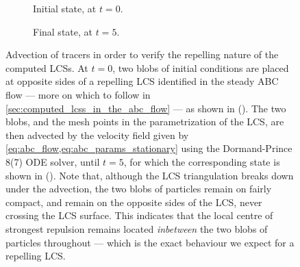 \begin{figure}[htpb]
    \centering
    \hspace*{\fill}
    \begin{subfigure}[b]{0.43\textwidth}
        \centering
        \caption[]{{\small Initial state, at $t=0$.}}
        \label{fig:blobtest-pre}
    \end{subfigure}\hfill%
    \begin{subfigure}[b]{0.43\textwidth}
        \centering
        \caption[]{{\small Final state, at $t=5$.}}
        \label{fig:blobtest-post}
    \end{subfigure}%
    \hspace*{\fill}
    \caption[Advection of tracers in order to verify the repelling nature of
    the computed \newline{}LCSs]
    {%
        Advection of tracers in order to verify the repelling nature of the
        computed LCSs. At $t=0$, two blobs of initial conditions are placed
        at opposite sides of a repelling LCS identified in the
        steady ABC flow --- more on which to follow in
        \cref{sec:computed_lcss_in_the_abc_flow} --- as shown in
        (). The two blobs, and the mesh points in
        the parametrization of the LCS, are then advected by the velocity
        field given by \cref{eq:abc_flow,eq:abc_params_stationary} using the
        Dormand-Prince 8(7) ODE solver, until $t=5$, for which the
        corresponding state is shown in (). Note
        that, although the LCS triangulation breaks down under the advection,
        the two blobs of particles remain on fairly compact, and remain on the
        opposite sides of the LCS, never crossing the LCS surface. This
        indicates that the local centre of strongest repulsion remains located
        \emph{inbetween} the two blobs of particles throughout --- which
        is the exact behaviour we expect for a repelling LCS.
    }
    \label{fig:blobtest}
\end{figure}

